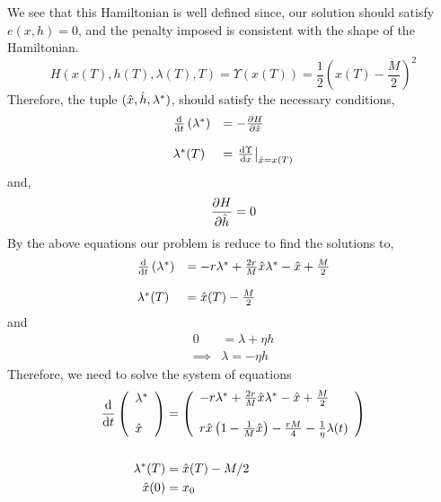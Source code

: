 We see that this Hamiltonian is well defined since, our solution should satisfy $e(x,h)=0$, and the penalty imposed is consistent with the shape of the Hamiltonian.
\begin{equation}
	H\left(x(T), h(T), \lambda(T), T \right)=\Upsilon(x(T))=\frac{1}{2}\left(x(T)-\frac{M}{2}\right)^2
\end{equation}
Therefore, the tuple $(\hat{x}, \hat{h},{\lambda}^{\ast})$, should satisfy the necessary conditions,
\begin{align}
\begin{array}{ll}
\frac{\mathrm{d} }{{\mathrm{d} t}}\left({\lambda}^{\ast}\right)&=-\frac{\partial H}{{\partial \hat{x}}} \\ \\
{\lambda}^{\ast}(T)&=\left.\frac{\mathrm{d} \Upsilon}{{\mathrm{d} x}}\right|_{\hat{x}=x(T)}
\end{array}
\end{align}
and,
\begin{align}
\frac{\partial H}{{\partial \hat{h}}}=0
\end{align}
By the above equations our problem is reduce to find the solutions to,
\begin{equation}
\begin{array}{ll}
\frac{\mathrm{d} }{{\mathrm{d} t}}\left({\lambda}^{\ast}\right)&=-r{\lambda}^{\ast}+\frac{2r}{M}\hat{x}{\lambda}^{\ast} -\hat{x}+\frac{M}{2} \\ \\
{\lambda}^{\ast}(T)&=\hat{x}(T)-\frac{M}{2}
\end{array}	
\end{equation}
and
\begin{align}
	0&=\lambda + \eta h \\
	\implies&\lambda=-\eta h
\end{align}
Therefore, we need to solve the system of equations
\begin{align}
\frac{\mathrm{d} }{{\mathrm{d} t}}\left(\begin{array}{l}
{\lambda}^{\ast}\\ \\ \hat{x}
\end{array}\right)&= \left(\begin{array}{l}
-r{\lambda}^{\ast}+\frac{2r}{M}\hat{x}{\lambda}^{\ast}-\hat{x}+\frac{M}{2}\\ \\ r\hat{x}\left(1-\frac{1}{M}\hat{x}\right)-\frac{rM}{4}-\frac{1}{\eta} \lambda(t)
\end{array}\right)\label{eq: PontryaginLambdaCondition}\\ \\
{\lambda}^{\ast}(T)&=\hat{x}(T)-M/2\label{eq:PontryaginBoundary}\\
\hat{x}(0)&=x_0 \label{eq:Pontryaginx0}
\end{align}

